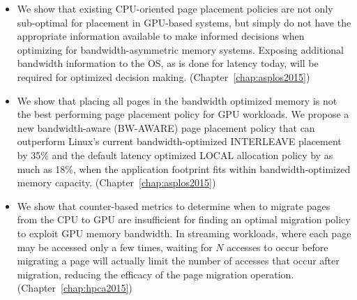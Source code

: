 \begin{itemize}
\item
We show that existing CPU-oriented page placement policies are not only 
sub-optimal for placement in GPU-based systems, but simply do not have the 
appropriate information available to make informed decisions when optimizing for 
bandwidth-asymmetric memory systems. Exposing additional bandwidth information 
to the OS, as is done for latency today, will be required for optimized decision 
making. (Chapter~\ref{chap:asplos2015})

\item
We show that placing all pages in the bandwidth optimized memory is not the best
performing page placement policy for GPU workloads.  We propose a new
bandwidth-aware (BW-AWARE) page placement policy that can outperform Linux's
current bandwidth-optimized INTERLEAVE placement by 35\% and the default latency
optimized LOCAL allocation policy by as much as 18\%, when the application
footprint fits within bandwidth-optimized memory capacity.
(Chapter~\ref{chap:asplos2015})


\item
We show that counter-based metrics to determine when to migrate pages from the
CPU to GPU are insufficient for finding an optimal migration policy to exploit
GPU memory bandwidth.  In streaming workloads, where each page may be accessed
only a few times, waiting for $N$ accesses to occur before migrating a page will
actually limit the number of accesses that occur after migration, reducing the
efficacy of the page migration operation. (Chapter~\ref{chap:hpca2015})



\end{itemize}
